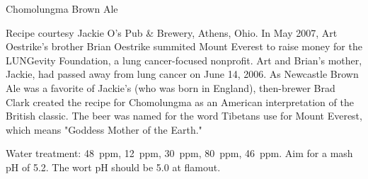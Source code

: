 \stylesection{\stylespecialtybeer}

\begin{recipie}{Chomolungma Brown Ale}

\begin{aboutblock}
Recipe courtesy Jackie O's Pub \& Brewery, Athens, Ohio.
In May 2007, Art Oestrike's brother Brian Oestrike summited Mount Everest
to raise money for the LUNG\-evity Foundation, a lung cancer-focused nonprofit.
Art and Brian's mother, Jackie, had passed away from lung cancer on June 14, 2006.
As Newcastle Brown Ale was a favorite of Jackie's (who was born in England),
then-brewer Brad Clark created the recipe for Chomolungma as an American
interpretation of the British classic. The beer was named for the word Tibetans
use for Mount Everest, which means "Goddess Mother of the Earth."
\end{aboutblock}


\begin{methodandtiming}
 
\begin{mashsteps}
\end{mashsteps}

\begin{fermentationsteps}
\end{fermentationsteps}

\begin{directions}
Water treatment:  48~ppm,  12~ppm,  30~ppm,
 80~ppm,  46~ppm. Aim for a mash pH of 5.2. The wort pH
should be 5.0 at flamout. 
\end{directions}

\end{methodandtiming}

\pagebreak

\begin{ingredientsblock}

\begin{malts}
\end{malts}

\begin{hops}
\end{hops}

\begin{yeasts}
\end{yeasts}

\end{ingredientsblock}

\end{recipie}